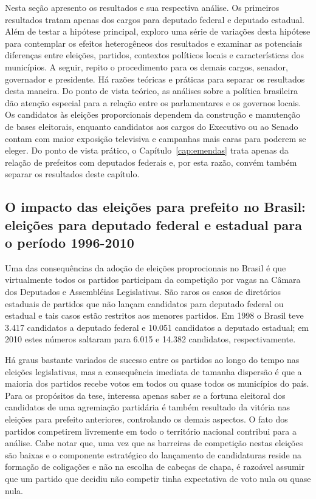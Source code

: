 Nesta seção apresento os resultados e sua respectiva análise. Os primeiros resultados tratam apenas dos cargos para deputado federal e deputado estadual. Além de testar a hipótese principal, exploro uma série de variações desta hipótese para contemplar os efeitos heterogêneos dos resultados e examinar as potenciais diferenças entre eleições, partidos, contextos políticos locais e características dos municípios. A seguir, repito o procedimento para os demais cargos, senador, governador e presidente. Há razões teóricas e práticas para separar os resultados desta maneira. Do ponto de vista teórico, as análises sobre a política brasileira dão atenção especial para a relação entre os parlamentares e os governos locais. Os candidatos às eleições proporcionais dependem  da construção e manutenção de bases eleitorais, enquanto candidatos aos cargos do Executivo ou ao Senado contam com maior exposição televisiva e campanhas mais caras para poderem se eleger. Do ponto de vista prático, o Capítulo~\ref{cap:emendas} trata apenas da relação de prefeitos com deputados federais e, por esta razão, convém também separar os resultados deste capítulo.

\subsection{O impacto das eleições para prefeito no Brasil: eleições para deputado federal e estadual para o período 1996-2010}

Uma das consequências da adoção de eleições proprocionais no Brasil é que virtualmente todos os partidos participam da competição por vagas na Câmara dos Deputados e Assembléias Legislativas. São raros os casos de diretórios estaduais de partidos que não lançam candidatos para deputado federal ou estadual e tais casos estão restritos aos menores partidos. Em 1998 o Brasil teve 3.417 candidatos a deputado federal e 10.051 candidatos a deputado estadual; em 2010 estes números saltaram para 6.015 e 14.382 candidatos, respectivamente.

Há graus bastante variados de sucesso entre os partidos ao longo do tempo nas eleições legislativas, mas a consequência imediata de tamanha dispersão é que a maioria dos partidos recebe votos em todos ou quase todos os municípios do país. Para os propósitos da tese, interessa apenas saber se a fortuna eleitoral dos candidatos de uma agremiação partidária é também resultado da vitória nas eleições para prefeito anteriores, controlando os demais aspectos. O fato dos partidos competirem livremente em todo o território nacional contribui para a análise. Cabe notar que, uma vez que as barreiras de competição nestas eleições são baixas e o componente estratégico do lançamento de candidaturas reside na formação de coligações e não na escolha de cabeças de chapa, é razoável assumir que um partido que decidiu não competir tinha expectativa de voto nula ou quase nula.


